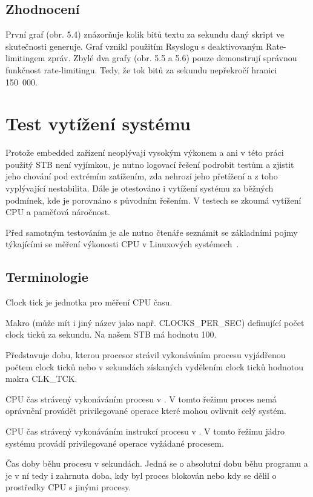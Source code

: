 \documentclass[thesis=B,czech]{FITthesis}[2012/06/26]
\begin{document}
\subsection{Zhodnocení}
První graf (obr. 5.4) znázorňuje kolik bitů textu za sekundu daný skript ve skutečnosti generuje. Graf vznikl použitím Rsyslogu s deaktivovaným Rate-limitingem zpráv.
Zbylé dva grafy (obr. 5.5 a 5.6) pouze demonstrují správnou funkčnost rate-limitingu. Tedy, že tok bitů za sekundu nepřekročí hranici 150~000.

\section{Test vytížení systému}
Protože embedded zařízení neoplývají vysokým výkonem a ani v této práci použitý STB není vyjímkou, je nutno logovací řešení podrobit testům a zjistit jeho chování pod extrémím zatížením, zda nehrozí jeho přetížení a z toho vyplývající nestabilita. Dále je otestováno i vytížení systému za běžných podmínek, kde je porovnáno s původním řešením. V testech se zkoumá vytížení CPU a paměťová náročnost.

Před samotným testováním je ale nutno čtenáře seznámit se základními pojmy týkajícími se měření výkonosti CPU v Linuxových systémech~\cite{MeasuringPerformance}.

\subsection{Terminologie}

\begin{description}
\setlength\itemsep{-1ex}
	\item [Clock tick:] Clock tick je jednotka pro měření CPU času.
	\item [CLK\_TCK:] Makro (může mít i jiný název jako např. CLOCKS\_PER\_SEC) definující počet clock ticků za sekundu. Na našem STB má hodnotu 100.
	\item [CPU time (CPU čas):] Představuje dobu, kterou procesor strávil vykonáváním procesu vyjádřenou počtem clock ticků nebo v sekundách získaných vydělením clock ticků hodnotou makra CLK\_TCK.
	\item [User time:] CPU čas strávený vykonáváním procesu v . V tomto řežimu proces nemá oprávnění provádět privilegované operace které mohou ovlivnit celý systém.
	\item [System time:] CPU čas strávený vykonáváním instrukcí procesu v . V tomto řežimu jádro systému provádí privilegované operace vyžádané procesem.
	\item [Real time:] Čas doby běhu procesu v sekundách. Jedná se o absolutní dobu běhu programu a je v ní tedy i zahrnuta doba, kdy byl proces blokován nebo kdy se dělil o prostředky CPU s jinými procesy.
	\end{description}
\end{document}
